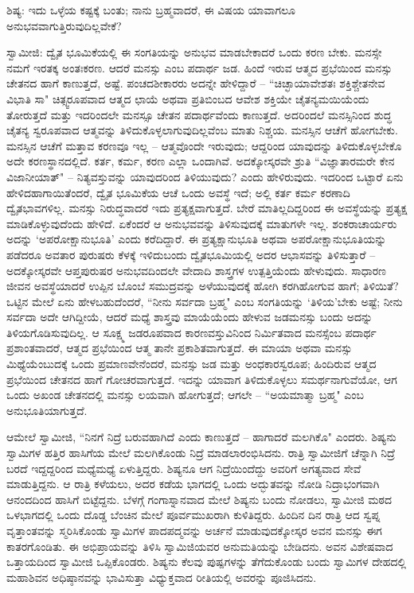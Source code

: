 ಶಿಷ್ಯ: ಇದು ಒಳ್ಳೆಯ ಕಷ್ಟಕ್ಕೆ ಬಂತು; ನಾನು ಬ್ರಹ್ಮವಾದರೆ, ಈ ವಿಷಯ ಯಾವಾಗಲೂ ಅನುಭವವಾಗುತ್ತಿರುವುದಿಲ್ಲವೇಕೆ?

ಸ್ವಾಮೀಜಿ: ದ್ವೈತ ಭೂಮಿಕೆಯಲ್ಲಿ ಈ ಸಂಗತಿಯನ್ನು ಅನುಭವ ಮಾಡಬೇಕಾದರೆ ಒಂದು ಕರಣ ಬೇಕು. ಮನಸ್ಸೇ ನಮಗೆ ಇರತಕ್ಕ ಅಂತಃಕರಣ. ಆದರೆ ಮನಸ್ಸು ಎಂಬ ಪದಾರ್ಥ ಜಡ. ಹಿಂದೆ ಇರುವ ಆತ್ಮದ ಪ್ರಭೆಯಿಂದ ಮನಸ್ಸು ಚೇತನದ ಹಾಗೆ ಕಾಣುತ್ತದೆ, ಅಷ್ಟೆ. ಪಂಚದಶೀಕಾರರು ಅದನ್ನೇ ಹೇಳಿದ್ದಾರೆ – “ಚಿಚ್ಛಾಯಾವೇಶತಃ ಶಕ್ತಿಶ್ಚೇತನೇವ ವಿಭಾತಿ ಸಾ" ಚಿತ್ಸ್ವರೂಪವಾದ ಆತ್ಮದ ಛಾಯೆ ಅಥವಾ ಪ್ರತಿಬಿಂಬದ ಆವೇಶ ಶಕ್ತಿಯೇ ಚೈತನ್ಯಮಯಿಯೆಂದು ತೋರುತ್ತದೆ ಮತ್ತು ಇದರಿಂದಲೇ ಮನಸ್ಸೂ ಚೇತನ ಪದಾರ್ಥವೆಂದು ಕಾಣುತ್ತದೆ. ಅದರಿಂದಲೆ ಮನಸ್ಸಿನಿಂದ ಶುದ್ಧ ಚೈತನ್ಯ ಸ್ವರೂಪವಾದ ಆತ್ಮವನ್ನು ತಿಳಿದುಕೊಳ್ಳಲಾಗುವುದಿಲ್ಲವೆಂಬ ಮಾತು ನಿಶ್ಚಯ. ಮನಸ್ಸಿನ ಆಚೆಗೆ ಹೋಗಬೇಕು. ಮನಸ್ಸಿನ ಆಚೆಗೆ ಮತ್ತಾವ ಕರಣವೂ ಇಲ್ಲ – ಆತ್ಮವೊಂದೇ ಇರುವುದು; ಆದ್ದರಿಂದ ಯಾವುದನ್ನು ತಿಳಿದುಕೊಳ್ಳಬೇಕೊ ಅದೇ ಕರಣಸ್ಥಾನದಲ್ಲಿದೆ. ಕರ್ತ, ಕರ್ಮ, ಕರಣ ಎಲ್ಲಾ ಒಂದಾಗಿವೆ. ಅದಕ್ಕೋಸ್ಕರವೇ ಶ್ರುತಿ “ವಿಜ್ಞಾತಾರಮರೇ ಕೇನ ವಿಜಾನೀಯಾತ್" – ನಿತ್ಯವಸ್ತುವನ್ನು ಯಾವುದರಿಂದ ತಿಳಿಯುವುದು? ಎಂದು ಹೇಳಿರುವುದು. ಇದರಿಂದ ಒಟ್ಟಾರೆ ಏನು ಹೇಳಿದಹಾಗಾಯಿತೆಂದರೆ, ದ್ವೈತ ಭೂಮಿಕೆಯ ಆಚೆ ಒಂದು ಅವಸ್ಥೆ ಇದೆ; ಅಲ್ಲಿ ಕರ್ತ ಕರ್ಮ ಕರಣಾದಿ ದ್ವೈತಭಾವಗಳಿಲ್ಲ. ಮನಸ್ಸು ನಿರುದ್ಧವಾದರೆ ಇದು ಪ್ರತ್ಯಕ್ಷವಾಗುತ್ತದೆ. ಬೇರೆ ಮಾತಿಲ್ಲದಿದ್ದರಿಂದ ಈ ಅವಸ್ಥೆಯನ್ನು ಪ್ರತ್ಯಕ್ಷ ಮಾಡಿಕೊಳ್ಳುವುದೆಂದು ಹೇಳಿದೆ. ಏಕೆಂದರೆ ಆ ಅನುಭವವನ್ನು ತಿಳಿಸುವುದಕ್ಕೆ ಮಾತುಗಳೇ ಇಲ್ಲ. ಶಂಕರಾಚಾರ್ಯರು ಅದನ್ನು ‘ಅಪರೋಕ್ಷಾನುಭೂತಿ’ ಎಂದು ಕರೆದಿದ್ದಾರೆ. ಈ ಪ್ರತ್ಯಕ್ಷಾನುಭೂತಿ ಅಥವಾ ಅಪರೋಕ್ಷಾನುಭೂತಿಯನ್ನು ಪಡೆದರೂ ಅವತಾರ ಪುರುಷರು ಕೆಳಕ್ಕೆ ಇಳಿದುಬಂದು ದ್ವೈತಭೂಮಿಯಲ್ಲಿ ಅದರ ಆಭಾಸವನ್ನು ತಿಳಿಸುತ್ತಾರೆ – ಅದಕ್ಕೋಸ್ಕರವೇ ಆಪ್ತಪುರುಷರ ಅನುಭವದಿಂದಲೇ ವೇದಾದಿ ಶಾಸ್ತ್ರಗಳ ಉತ್ಪತ್ತಿಯೆಂದು ಹೇಳುವುದು. ಸಾಧಾರಣ ಜೀವನ ಅವಸ್ಥೆಯಾದರೆ ಉಪ್ಪಿನ ಬೊಂಬೆ ಸಮುದ್ರವನ್ನು ಅಳೆಯುವುದಕ್ಕೆ ಹೋಗಿ ಕರಗಿಹೋಗುವ ಹಾಗೆ; ತಿಳಿಯಿತೆ? ಒಟ್ಟಿನ ಮೇಲೆ ಏನು ಹೇಳಬಹುದೆಂದರೆ, “ನೀನು ಸರ್ವದಾ ಬ್ರಹ್ಮ" ಎಂಬ ಸಂಗತಿಯನ್ನು ‘ತಿಳಿಯ’ಬೇಕು ಅಷ್ಟೆ; ನೀನು ಸರ್ವದಾ ಅದೇ ಆಗಿದ್ದೀಯೆ, ಆದರೆ ಮಧ್ಯೆ ಶಾಸ್ತ್ರವು ಮಾಯೆಯೆಂದು ಹೇಳುವ ಜಡಮನಸ್ಸು ಬಂದು ಅದನ್ನು ತಿಳಿಯಗೊಡಿಸುವುದಿಲ್ಲ. ಆ ಸೂಕ್ಷ್ಮ ಜಡರೂಪವಾದ ಕಾರಣವಸ್ತುವಿನಿಂದ ನಿರ್ಮಿತವಾದ ಮನಸ್ಸೆಂಬ ಪದಾರ್ಥ ಪ್ರಶಾಂತವಾದರೆ, ಆತ್ಮದ ಪ್ರಭೆಯಿಂದ ಆತ್ಮ ತಾನೇ ಪ್ರಕಾಶಿತವಾಗುತ್ತದೆ. ಈ ಮಾಯಾ ಅಥವಾ ಮನಸ್ಸು ಮಿಥ್ಯೆಯೆಂಬುದಕ್ಕೆ ಒಂದು ಪ್ರಮಾಣವೇನೆಂದರೆ, ಮನಸ್ಸು ಜಡ ಮತ್ತು ಅಂಧಕಾರಸ್ವರೂಪ; ಹಿಂದಿರುವ ಆತ್ಮದ ಪ್ರಭೆಯಿಂದ ಚೇತನದ ಹಾಗೆ ಗೋಚರವಾಗುತ್ತದೆ. ಇದನ್ನು ಯಾವಾಗ ತಿಳಿದುಕೊಳ್ಳಲು ಸಮರ್ಥನಾಗುವೆಯೋ, ಆಗ ಒಂದು ಅಖಂಡ ಚೇತನದಲ್ಲಿ ಮನಸ್ಸು ಲಯವಾಗಿ ಹೋಗುತ್ತದೆ; ಆಗಲೇ – “ಅಯಮಾತ್ಮಾ ಬ್ರಹ್ಮ" ಎಂಬ ಅನುಭೂತಿಯಾಗುತ್ತದೆ.

ಆಮೇಲೆ ಸ್ವಾಮೀಜಿ, “ನಿನಗೆ ನಿದ್ರೆ ಬರುವಹಾಗಿದೆ ಎಂದು ಕಾಣುತ್ತದೆ – ಹಾಗಾದರೆ ಮಲಗಿಕೊ" ಎಂದರು. ಶಿಷ್ಯನು ಸ್ವಾಮಿಗಳ ಹತ್ತಿರ ಹಾಸಿಗೆಯ ಮೇಲೆ ಮಲಗಿಕೊಂಡು ನಿದ್ರೆ ಮಾಡಲಾರಂಭಿಸಿದನು. ರಾತ್ರಿ ಸ್ವಾಮೀಜಿಗೆ ಚೆನ್ನಾಗಿ ನಿದ್ರೆ ಬರದೆ ಇದ್ದದ್ದರಿಂದ ಮಧ್ಯೆಮಧ್ಯೆ ಏಳುತ್ತಿದ್ದರು. ಶಿಷ್ಯನೂ ಆಗ ನಿದ್ರೆಯಿಂದೆದ್ದು ಅವರಿಗೆ ಅಗತ್ಯವಾದ ಸೇವೆ ಮಾಡುತ್ತಿದ್ದನು. ಆ ರಾತ್ರಿ ಕಳೆಯಲು, ಅದರ ಕಡೆಯ ಭಾಗದಲ್ಲಿ ಒಂದು ಅದ್ಭುತವನ್ನು ನೋಡಿ ನಿದ್ರಾಭಂಗವಾಗಿ ಆನಂದದಿಂದ ಹಾಸಿಗೆ ಬಿಟ್ಟೆದ್ದನು. ಬೆಳಗ್ಗೆ ಗಂಗಾಸ್ನಾನವಾದ ಮೇಲೆ ಶಿಷ್ಯನು ಬಂದು ನೋಡಲು, ಸ್ವಾಮೀಜಿ ಮಠದ ಒಳಭಾಗದಲ್ಲಿ ಒಂದು ದೊಡ್ಡ ಬೆಂಚಿನ ಮೇಲೆ ಪೂರ್ವಮುಖರಾಗಿ ಕುಳಿತಿದ್ದರು. ಹಿಂದಿನ ದಿನ ರಾತ್ರಿ ಆದ ಸ್ವಪ್ನ ವೃತ್ತಾಂತವನ್ನು ಸ್ಮರಿಸಿಕೊಂಡು ಸ್ವಾಮಿಗಳ ಪಾದಪದ್ಮವನ್ನು ಅರ್ಚನೆ ಮಾಡುವುದಕ್ಕೋಸ್ಕರ ಅವನ ಮನಸ್ಸು ಈಗ ಕಾತರಗೊಂಡಿತು. ಈ ಅಭಿಪ್ರಾಯವನ್ನು ತಿಳಿಸಿ ಸ್ವಾಮಿಜಿಯವರ ಅನುಮತಿಯನ್ನು ಬೇಡಿದನು. ಅವನ ವಿಶೇಷವಾದ ಒತ್ತಾಯದಿಂದ ಸ್ವಾಮೀಜಿ ಒಪ್ಪಿಕೊಂಡರು. ಶಿಷ್ಯನು ಕೆಲವು ಪುಷ್ಪಗಳನ್ನು ತೆಗೆದುಕೊಂಡು ಬಂದು ಸ್ವಾಮಿಗಳ ದೇಹದಲ್ಲಿ ಮಹಾಶಿವನ ಅಧಿಷ್ಠಾನವನ್ನು ಭಾವಿಸುತ್ತಾ ವಿಧ್ಯುಕ್ತವಾದ ರೀತಿಯಲ್ಲಿ ಅವರನ್ನು ಪೂಜಿಸಿದನು.

